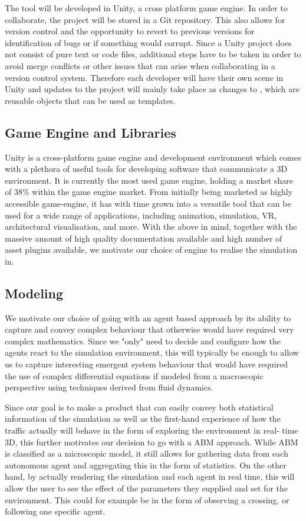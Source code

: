 The tool will be developed in Unity, a cross platform game engine. In order to collaborate, the project will be stored in a Git repository. This also allows for version control and the opportunity to revert to previous versions for identification of bugs or if something would corrupt. Since a Unity project does not consist of pure text or code files, additional steps have to be taken in order to avoid merge conflicts or other issues that can arise when collaborating in a version control system. Therefore each developer will have their own scene in Unity and updates to the project will mainly take place as changes to , which are reusable objects that can be used as templates.

\subsection{Game Engine and Libraries}
Unity is a cross-platform game engine and development environment which comes with a plethora of useful tools for developing software that communicate a 3D environment. It is currently the most used game engine, holding a market share of 38\% within the game engine market. From initially being marketed as highly accessible game-engine, it has with time grown into a versatile tool that can be used for a wide range of applications, including animation, simulation, VR, architectural visualisation, and more. With the above in mind, together with the massive amount of high quality documentation available and high number of asset plugins available, we motivate our choice of engine to realise the simulation in. 

\subsection{Modeling}
We motivate our choice of going with an agent based approach by its ability to capture and convey complex behaviour that otherwise would have required very complex mathematics. Since we "only" need to decide and configure how the agents react to the simulation environment, this will typically be enough to allow us to capture interesting emergent system behaviour that would have required the use of complex differential equations if modeled from a macroscopic perspective using techniques derived from fluid dynamics. 

Since our goal is to make a product that can easily convey both statistical information of the simulation as well as the first-hand experience of how the traffic actually will behave in the form of exploring the environment in real- time 3D, this further motivates our decision to go with a ABM approach. While ABM is classified as a microscopic model, it still allows for gathering data from each autonomous agent and aggregating this in the form of statistics. On the other hand, by actually rendering the simulation and each agent in real time, this will allow the user to see the effect of the parameters they supplied and set for the environment. This could for example be in the form of observing a crossing, or following one specific agent. 

